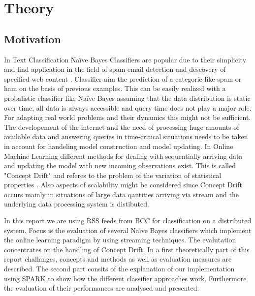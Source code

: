 \documentclass[12pt]{article}
\begin{document}


\renewcommand{\contentsname}{Table of Contents}
\tableofcontents

\newpage



\section{Theory}
\subsection{Motivation}
\begin{spacing}{1.2}
In Text Classification Na\"ive Bayes Classifiers are popular due to their simplicity and find application in the field of spam email detection and descovery of specified web content \citep[p. 225]{ertel2008}. Classifier aim the prediction of a categorie like spam or ham on the basis of previous examples. This can be easily realized with a probalistic classifier like Na\"ive Bayes assuming that the data distribution is static over time, all data is always accessible and query time does not play a major role. For adapting real world problems and their dynamics this might not be sufficient. The developement of the internet and the need of processing huge amounts of available data and answering queries in time-critical situations needs to be taken in account for handeling model construction and model updating. In Online Machine Learning different methods for dealing with sequentially arriving data and updating the model with new incoming observations exist. This is called "Concept Drift" and referes to the problem of the variation of statistical properties \citep{astudillo2013}. Also aspects of scalability might be considered since Concept Drift occurs mainly in situations of large data qantities arriving via stream \citep[p. 4]{tsymbal2004} and the underlying data processing system is distibuted.   

In this report we are using RSS feeds from BCC for classification on a distributed system. Focus is the evaluation of several Na\"ive Bayes classifiers which implement the online learning paradigm by using streaming techniques.  The evalutation concentrates on the handling of Concept Drift. In a first theoretically part of this report challanges, concepts and methods as well as evaluation measures are described. The second part consits of the explanation of our implementation using SPARK to show how the different classifier approaches work. Furthermore the evaluation of their performances are analysed and presented.

\end{spacing}
\end{document}
